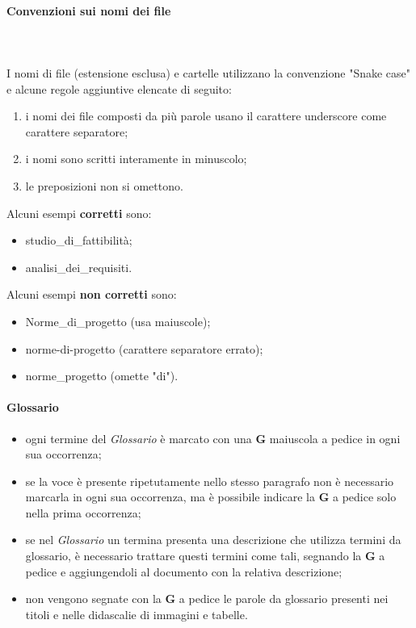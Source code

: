 		\paragraph{Convenzioni sui nomi dei file} \mbox{}\\ \mbox{}\\
		I nomi di file (estensione esclusa) e cartelle utilizzano la convenzione "Snake case\glo" e alcune regole aggiuntive elencate di seguito:
		\begin{enumerate}
			\item i nomi dei file composti da più parole usano il carattere underscore come carattere separatore;
			\item i nomi sono scritti interamente in minuscolo;
			\item le preposizioni non si omettono.
		\end{enumerate}
		Alcuni esempi \textbf{corretti} sono:
		\begin{itemize}
			\item studio\_di\_fattibilità;
			\item analisi\_dei\_requisiti.
		\end{itemize}	 	
		Alcuni esempi \textbf{non corretti} sono: 
		\begin{itemize}
			\item Norme\_di\_progetto (usa maiuscole);
			\item norme-di-progetto (carattere separatore errato);
			\item norme\_progetto (omette "di").
		\end{itemize}
		\paragraph{Glossario}
		\begin{itemize}
			\item ogni termine del \textit{Glossario} è marcato con una \textbf{G} maiuscola a pedice in ogni sua occorrenza;
			\item se la voce è presente ripetutamente nello stesso paragrafo non è necessario marcarla in ogni sua occorrenza, ma è possibile indicare la \textbf{G} a pedice solo nella prima occorrenza;
			\item se nel \textit{Glossario} un termina presenta una descrizione che utilizza termini da glossario, è necessario trattare questi termini come tali, segnando la \textbf{G} a pedice e aggiungendoli al documento con la relativa descrizione;
			\item non vengono segnate con la \textbf{G} a pedice  le parole da glossario presenti nei titoli e nelle didascalie di immagini e tabelle.
		\end{itemize}			

